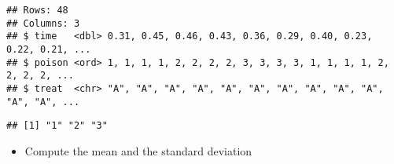 \documentclass[
]{article}
\newenvironment{Shaded}{\begin{snugshade}}{\end{snugshade}}
\newcommand{\DataTypeTok}[1]{\textcolor[rgb]{0.13,0.29,0.53}{#1}}
\newcommand{\KeywordTok}[1]{\textcolor[rgb]{0.13,0.29,0.53}{\textbf{#1}}}
\newcommand{\NormalTok}[1]{#1}
\newcommand{\OperatorTok}[1]{\textcolor[rgb]{0.81,0.36,0.00}{\textbf{#1}}}
\newcommand{\OtherTok}[1]{\textcolor[rgb]{0.56,0.35,0.01}{#1}}
\newcommand{\StringTok}[1]{\textcolor[rgb]{0.31,0.60,0.02}{#1}}
\providecommand{\tightlist}{%
  \setlength{\itemsep}{0pt}\setlength{\parskip}{0pt}}
\begin{document}
\begin{Shaded}
\end{Shaded}

\begin{verbatim}
## Rows: 48
## Columns: 3
## $ time   <dbl> 0.31, 0.45, 0.46, 0.43, 0.36, 0.29, 0.40, 0.23, 0.22, 0.21, ...
## $ poison <ord> 1, 1, 1, 1, 2, 2, 2, 2, 3, 3, 3, 3, 1, 1, 1, 1, 2, 2, 2, 2, ...
## $ treat  <chr> "A", "A", "A", "A", "A", "A", "A", "A", "A", "A", "A", "A", ...
\end{verbatim}

\begin{Shaded}
\end{Shaded}

\begin{verbatim}
## [1] "1" "2" "3"
\end{verbatim}

\begin{itemize}
\tightlist
\item
  Compute the mean and the standard deviation
\end{itemize}

\begin{Shaded}
\end{Shaded}
\end{document}
